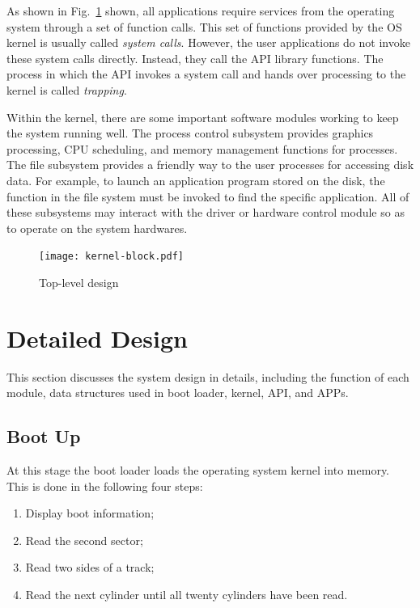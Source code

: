 \documentclass{swfcthesis}
\begin{document}
As shown in Fig.~\ref{fig:top-level} shown, all applications require services from the
operating system through a set of function calls. This set of functions provided by the OS
kernel is usually called \emph{system calls}. However, the user applications do not invoke
these system calls directly. Instead, they call the API library functions. The process in
which the API invokes a system call and hands over processing to the kernel is called
\emph{trapping}.

Within the kernel, there are some important software modules working to keep the system
running well. The process control subsystem provides graphics processing, CPU scheduling,
and memory management functions for processes.  The file
subsystem provides a friendly way to the user processes for accessing disk data. For
example, to launch an application program stored on the disk, the function in the file
system must be invoked to find the specific application. All of these subsystems may
interact with the driver or hardware control module so as to operate on the system
hardwares.

\begin{figure}%
  \centering
  \texttt{[image: kernel-block.pdf]}
  \caption{Top-level design}
  \label{fig:top-level}
\end{figure}


\section{Detailed Design}
\label{sec:detailed-design}

This section discusses the system design in details, including the function of each
module, data structures used in boot loader, kernel, API, and APPs.

\subsection{Boot Up}
\label{sec:boot-up}

At this stage the boot loader loads the operating system kernel into memory. This is done
in the following four steps:
\begin{enumerate}
\item Display boot information;
\item Read the second sector;
\item Read two sides of a track;
\item Read the next cylinder until all twenty cylinders have been read.
\end{enumerate}
\end{document}
